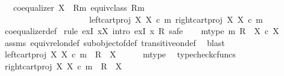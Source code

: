 \begin{isabellebody}
\ \ \ {\isachardoublequoteopen}coequalizer\ {\isacharparenleft}{\kern0pt}X\ {\isasymsslash}\ {\isacharparenleft}{\kern0pt}R{\isacharcomma}{\kern0pt}m{\isacharparenright}{\kern0pt}{\isacharparenright}{\kern0pt}\ {\isacharparenleft}{\kern0pt}equiv{\isacharunderscore}{\kern0pt}class\ {\isacharparenleft}{\kern0pt}R{\isacharcomma}{\kern0pt}m{\isacharparenright}{\kern0pt}{\isacharparenright}{\kern0pt}\isanewline
\ \ \ \ \ \ \ \ \ \ \ \ \ \ \ \ \ \ \ \ \ {\isacharparenleft}{\kern0pt}left{\isacharunderscore}{\kern0pt}cart{\isacharunderscore}{\kern0pt}proj\ X\ X\ {\isasymcirc}\isactrlsub c\ m{\isacharparenright}{\kern0pt}\ {\isacharparenleft}{\kern0pt}right{\isacharunderscore}{\kern0pt}cart{\isacharunderscore}{\kern0pt}proj\ X\ X\ {\isasymcirc}\isactrlsub c\ m{\isacharparenright}{\kern0pt}{\isachardoublequoteclose}\isanewline
%
\isadelimproof
\ \ %
\endisadelimproof
%
\isatagproof
{}\isamarkupfalse%
\ coequalizer{\isacharunderscore}{\kern0pt}def\ \isanewline
{}\isamarkupfalse%
{\isacharparenleft}{\kern0pt}rule\ exI{\isacharbrackleft}{\kern0pt}\ x{\isacharequal}{\kern0pt}X{\isacharbrackright}{\kern0pt}{\isacharcomma}{\kern0pt}\ intro\ exI{\isacharbrackleft}{\kern0pt}\ x{\isacharequal}{\kern0pt}\ R{\isacharbrackright}{\kern0pt}{\isacharcomma}{\kern0pt}\ safe{\isacharparenright}{\kern0pt}\isanewline
\ \ \isamarkupfalse%
\ m{\isacharunderscore}{\kern0pt}type{\isacharcolon}{\kern0pt}\ {\isachardoublequoteopen}m{\isacharcolon}{\kern0pt}\ R\ {\isasymrightarrow}\ X\ {\isasymtimes}\isactrlsub c\ X{\isachardoublequoteclose}\isanewline
\ \ \ \ \isamarkupfalse%
\ assms\ equiv{\isacharunderscore}{\kern0pt}rel{\isacharunderscore}{\kern0pt}on{\isacharunderscore}{\kern0pt}def\ subobject{\isacharunderscore}{\kern0pt}of{\isacharunderscore}{\kern0pt}def{}\ transitive{\isacharunderscore}{\kern0pt}on{\isacharunderscore}{\kern0pt}def\ \isamarkupfalse%
\ blast\isanewline
\ \ \isamarkupfalse%
\ {\isachardoublequoteopen}left{\isacharunderscore}{\kern0pt}cart{\isacharunderscore}{\kern0pt}proj\ X\ X\ {\isasymcirc}\isactrlsub c\ m\ {\isacharcolon}{\kern0pt}\ R\ {\isasymrightarrow}\ X{\isachardoublequoteclose}\isanewline
\ \ \ \ \isamarkupfalse%
\ m{\isacharunderscore}{\kern0pt}type\ \isamarkupfalse%
\ typecheck{\isacharunderscore}{\kern0pt}cfuncs\isanewline
\ \ \isamarkupfalse%
\ {\isachardoublequoteopen}right{\isacharunderscore}{\kern0pt}cart{\isacharunderscore}{\kern0pt}proj\ X\ X\ {\isasymcirc}\isactrlsub c\ m\ {\isacharcolon}{\kern0pt}\ R\ {\isasymrightarrow}\ X{\isachardoublequoteclose}\isanewline

\end{isabellebody}
